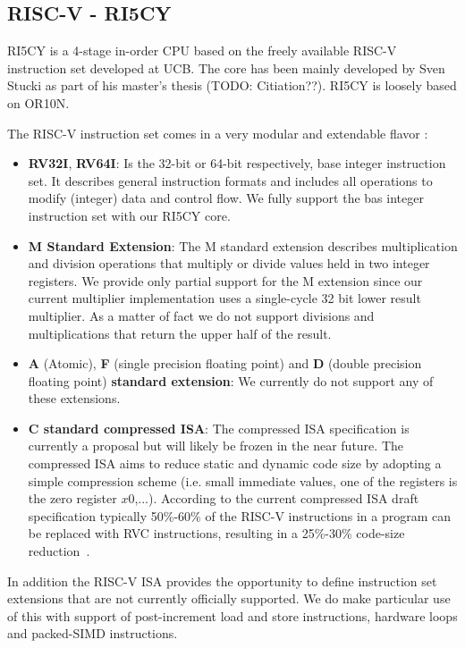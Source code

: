 \subsection{RISC-V - RI5CY}

RI5CY is a 4-stage in-order CPU based on the freely available RISC-V instruction set developed at UCB. The core has been mainly developed by Sven Stucki as part of his master's thesis (TODO: Citiation??). RI5CY is loosely based on OR10N. 

The RISC-V instruction set comes in a very modular and extendable flavor \cite{Waterman:EECS-2014-54}:

\begin{itemize}
    \item \textbf{RV32I}, \textbf{RV64I}: Is the 32-bit or 64-bit respectively, base integer instruction set. It describes general instruction formats and includes all operations to modify (integer) data and control flow. We fully support the bas integer instruction set with our RI5CY core.
    \item \textbf{M Standard Extension}: The M standard extension describes multiplication and division operations that multiply or divide values held in two integer registers. We provide only partial support for the M extension since our current multiplier implementation uses a single-cycle 32 bit lower result multiplier. As a matter of fact we do not support divisions and multiplications that return the upper half of the result.
    \item \textbf{A} (Atomic), \textbf{F} (single precision floating point) and \textbf{D} (double precision floating point) \textbf{standard extension}: We currently do not support any of these extensions.
    \item \textbf{C standard compressed ISA}: The compressed ISA specification is currently a proposal but will likely be frozen in the near future. The compressed ISA aims to reduce static and dynamic code size by adopting a simple compression scheme (i.e. small immediate values, one of the registers is the zero register $x0$,...). According to the current compressed ISA draft specification typically 50\%-60\% of the RISC-V instructions in a program can be replaced with RVC instructions, resulting in a 25\%-30\% code-size reduction~\cite{Waterman:EECS-2015-209}.
\end{itemize}

In addition the RISC-V ISA provides the opportunity to define instruction set extensions that are not currently officially supported. We do make particular use of this with support of post-increment load and store instructions, hardware loops and packed-SIMD instructions.


